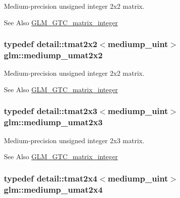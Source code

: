 Medium-\/precision unsigned integer 2x2 matrix. 

\begin{DoxySeeAlso}{See Also}
\hyperlink{group__gtc__matrix__integer}{G\-L\-M\-\_\-\-G\-T\-C\-\_\-matrix\-\_\-integer} 
\end{DoxySeeAlso}
\hypertarget{group__gtc__matrix__integer_gad7b4dd36037f24c8c2d7cac7e8ecb729}{
\subsubsection[{mediump\-\_\-umat2x2}]{\setlength{\rightskip}{0pt plus 5cm}typedef detail\-::tmat2x2$<$mediump\-\_\-uint$>$ {\bf glm\-::mediump\-\_\-umat2x2}}}\label{group__gtc__matrix__integer_gad7b4dd36037f24c8c2d7cac7e8ecb729}


Medium-\/precision unsigned integer 2x2 matrix. 

\begin{DoxySeeAlso}{See Also}
\hyperlink{group__gtc__matrix__integer}{G\-L\-M\-\_\-\-G\-T\-C\-\_\-matrix\-\_\-integer} 
\end{DoxySeeAlso}
\hypertarget{group__gtc__matrix__integer_gaa377342a4abe7f415218710e531b2731}{
\subsubsection[{mediump\-\_\-umat2x3}]{\setlength{\rightskip}{0pt plus 5cm}typedef detail\-::tmat2x3$<$mediump\-\_\-uint$>$ {\bf glm\-::mediump\-\_\-umat2x3}}}\label{group__gtc__matrix__integer_gaa377342a4abe7f415218710e531b2731}


Medium-\/precision unsigned integer 2x3 matrix. 

\begin{DoxySeeAlso}{See Also}
\hyperlink{group__gtc__matrix__integer}{G\-L\-M\-\_\-\-G\-T\-C\-\_\-matrix\-\_\-integer} 
\end{DoxySeeAlso}
\hypertarget{group__gtc__matrix__integer_ga62b45add166ab5be4e325a2cadec240d}{
\subsubsection[{mediump\-\_\-umat2x4}]{\setlength{\rightskip}{0pt plus 5cm}typedef detail\-::tmat2x4$<$mediump\-\_\-uint$>$ {\bf glm\-::mediump\-\_\-umat2x4}}}\label{group__gtc__matrix__integer_ga62b45add166ab5be4e325a2cadec240d}


